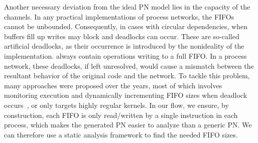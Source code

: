 \documentclass{sig-alternate}
\begin{document}
Another necessary deviation from the ideal PN model lies in the capacity of the channels.
In any practical implementations of process networks, the FIFOs cannot be unbounded.
Consequently, in cases with circular dependencies, when buffers fill up writes may block and deadlocks can occur. 
These are so-called artificial deadlocks, as their occurrence is introduced by the nonideality of the implementation. %
always contain operations writing to a full FIFO.
In a process network, %
these deadlocks, if left unresolved, would cause a mismatch between
the resultant behavior of the original code and the network. To tackle this problem, many approaches were proposed over the years, most of which involves monitoring execution and dynamically incrementing FIFO sizes when deadlock occurs~\cite{parks1995bounded}\cite{Geilen:2003:REK:1765712.1765736}\cite{4217338},
or only targets highly regular kernels.
In our flow, we ensure, by construction, each FIFO is only read/written by a single instruction in each process, which makes the generated PN easier to analyze than a generic PN. We can therefore use a static analysis framework to find the needed FIFO sizes.

\end{document}
